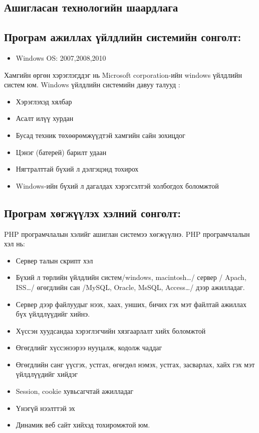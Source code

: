 \begin{itemize}
\newpage
\section{Ашигласан технологийн шаардлага}

\subsection{Програм ажиллах үйлдлийн системийн сонголт:}

\begin{itemize}
	\item Windows OS: 2007,2008,2010
\end{itemize}

Хамгийн өргөн хэрэглэгддэг нь Microsoft corporation-ийн windows үйлдлийн систем юм.  Windows үйлдлийн системийн давуу талууд :

\begin{itemize}
	\item Хэрэглэхэд хялбар
	\item Асалт илүү хурдан
	\item Бусад техник төхөөрөмжүүдтэй хамгийн сайн зохицдог
	\item Цэнэг (батерей) барилт удаан
	\item Нягтралттай бүхий л дэлгэцэнд тохирох
	\item Windows-ийн бүхий л дагалдах хэрэгсэлтэй холбогдох боломжтой
\end{itemize}

\subsection{Програм хөгжүүлэх хэлний сонголт:}

PHP  програмчлалын хэлийг ашиглан системээ хөгжүүлнэ. PHP програмчлалын хэл нь: 

\begin{itemize}
	\item Сервер талын скрипт хэл
	\item Бүхий л төрлийн үйлдлийн систем/windows, macintosh…/ сервер / Apach, ISS…/ өгөгдлийн сан /MySQL, Oracle, MsSQL, Access…/ дээр ажилладаг.
	\item Сервер дээр файлуудыг нээх, хаах, унших, бичих гэх мэт файлтай ажиллах бүх үйлдлүүдийг хийнэ. 
	\item Хүссэн хуудсандаа хэрэглэгчийн хязгаарлалт хийх боломжтой
	\item Өгөгдлийг хүссэнээрээ нууцалж, кодолж чаддаг
	\item Өгөгдлийн санг үүсгэх, устгах, өгөгдөл нэмэх, устгах, засварлах, хайх гэх мэт үйлдлүүдийг хийдэг
	\item Session, cookie хувьсагчтай ажилладаг
	\item Үнэгүй нээлттэй эх
	\item Динамик веб сайт хийхэд тохиромжтой юм. 
\end{itemize}


\end{itemize}
